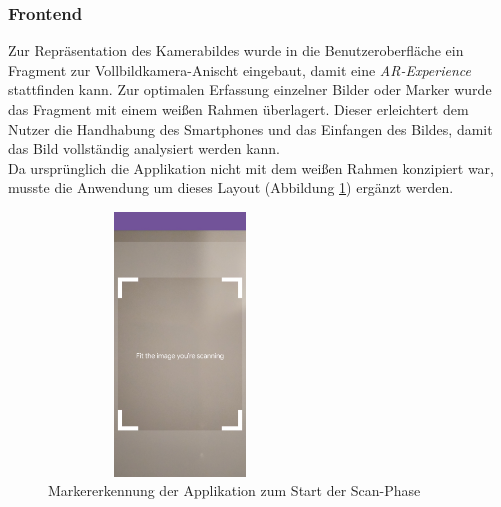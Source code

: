 \subsubsection{Frontend}
Zur Repräsentation des Kamerabildes wurde in die Benutzeroberfläche ein Fragment zur Vollbildkamera-Anischt eingebaut, damit eine \textit{\acs{AR}-Experience} 
stattfinden kann. Zur optimalen Erfassung einzelner Bilder oder Marker wurde das Fragment mit einem weißen Rahmen überlagert. Dieser erleichtert dem Nutzer die 
Handhabung des Smartphones und das Einfangen des Bildes, damit das Bild vollständig analysiert werden kann. 
\\ 
\linebreak
Da ursprünglich die Applikation nicht mit dem weißen Rahmen konzipiert war, musste die Anwendung um dieses Layout (Abbildung \ref{pic:image_tracking}) 
ergänzt werden. 
\begin{figure}[hbt!]
    \centering
    \includegraphics[width=7cm,height=7cm,keepaspectratio]{4Umsetzung/Bilder/image_tracking.jpg}
    \caption{Markererkennung der Applikation zum Start der Scan-Phase}
    \label{pic:image_tracking}
\end{figure}
\pagebreak 
\\ %
